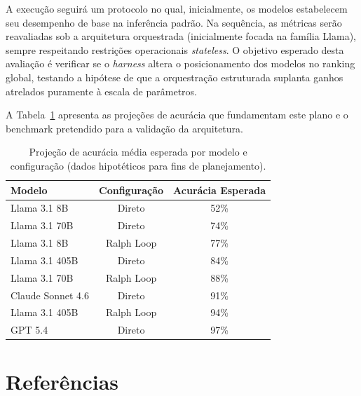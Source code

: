 \documentclass[a4paper,10pt,twocolumn]{article}
\newcommand{\helvetfont}[1]{{\fontfamily{phv}\selectfont #1}}
\begin{document}
A execução seguirá um protocolo no qual, inicialmente, os modelos estabelecem seu desempenho de base na inferência padrão. Na sequência, as métricas serão reavaliadas sob a arquitetura orquestrada (inicialmente focada na família Llama), sempre respeitando restrições operacionais \textit{stateless}. O objetivo esperado desta avaliação é verificar se o \textit{harness} altera o posicionamento dos modelos no ranking global, testando a hipótese de que a orquestração estruturada suplanta ganhos atrelados puramente à escala de parâmetros.

A Tabela~\ref{tab:dados-esperados} apresenta as projeções de acurácia que fundamentam este plano e o benchmark pretendido para a validação da arquitetura.

\begin{table}[H]
\centering
\caption{Projeção de acurácia média esperada por modelo e configuração (dados hipotéticos para fins de planejamento).}
\label{tab:dados-esperados}
\helvetfont{
\small
\begin{tabular}{lcc}
\toprule
\textbf{Modelo} & \textbf{Configuração} & \textbf{Acurácia Esperada} \\
\midrule
Llama 3.1 8B & Direto & 52\% \\
Llama 3.1 70B & Direto & 74\% \\
Llama 3.1 8B & Ralph Loop & 77\% \\
Llama 3.1 405B & Direto & 84\% \\
Llama 3.1 70B & Ralph Loop & 88\% \\
Claude Sonnet 4.6 & Direto & 91\% \\
Llama 3.1 405B & Ralph Loop & 94\% \\
GPT 5.4 & Direto & 97\% \\
\bottomrule
\end{tabular}
}
\end{table}

\section{Referências}

\printbibliography[heading=none]
\end{document}
